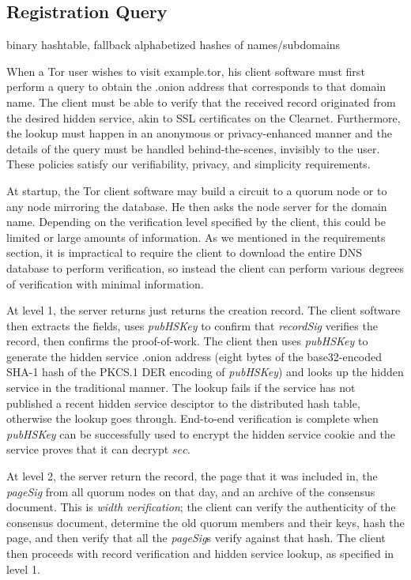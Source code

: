 \subsection{Registration Query}


binary hashtable, fallback alphabetized hashes of names/subdomains


When a Tor user wishes to visit example.tor, his client software must first perform a query to obtain the .onion address that corresponds to that domain name. The client must be able to verify that the received record originated from the desired hidden service, akin to SSL certificates on the Clearnet. Furthermore, the lookup must happen in an anonymous or privacy-enhanced manner and the details of the query must be handled behind-the-scenes, invisibly to the user. These policies satisfy our verifiability, privacy, and simplicity requirements.

At startup, the Tor client software may build a circuit to a quorum node or to any node mirroring the database. He then asks the node server for the domain name. Depending on the verification level specified by the client, this could be limited or large amounts of information. As we mentioned in the requirements section, it is impractical to require the client to download the entire DNS database to perform verification, so instead the client can perform various degrees of verification with minimal information.

At level 1, the server returns just returns the creation record. The client software then extracts the fields, uses \emph{pubHSKey} to confirm that \emph{recordSig} verifies the record, then confirms the proof-of-work. The client then uses \emph{pubHSKey} to generate the hidden service .onion address (eight bytes of the base32-encoded SHA-1 hash of the PKCS.1 DER encoding of \emph{pubHSKey}) and looks up the hidden service in the traditional manner. The lookup fails if the service has not published a recent hidden service desciptor to the distributed hash table, otherwise the lookup goes through. End-to-end verification is complete when \emph{pubHSKey} can be successfully used to encrypt the hidden service cookie and the service proves that it can decrypt $ sec $.

At level 2, the server return the record, the page that it was included in, the \emph{pageSig} from all quorum nodes on that day, and an archive of the consensus document. This is \emph{width verification}; the client can verify the authenticity of the consensus document, determine the old quorum members and their keys, hash the page, and then verify that all the \emph{pageSig}s verify against that hash. The client then proceeds with record verification and hidden service lookup, as specified in level 1.

